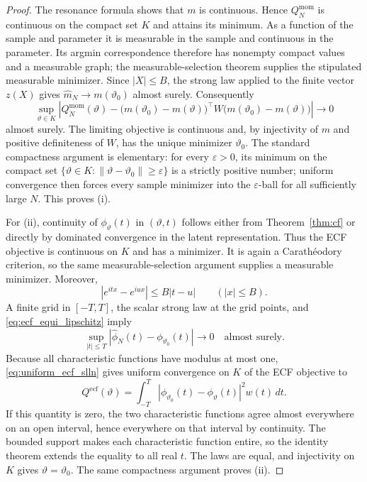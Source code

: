 \documentclass[11pt]{amsart}
\numberwithin{equation}{section}\setcounter{tocdepth}{3}\setcounter{secnumdepth}{3}
\begin{document}
\begin{proof}
The resonance formula shows that $m$ is continuous.  Hence
$Q_N^{\mathrm{mom}}$ is continuous on the compact set $K$ and attains its minimum.
As a function of the sample and parameter it is measurable in the sample and continuous
in the parameter.  Its argmin correspondence therefore has nonempty compact values and
a measurable graph; the measurable-selection theorem supplies the stipulated measurable
minimizer.
Since $|X|\le B$, the strong law applied to the finite vector $z(X)$ gives
$\widehat m_N\to m(\vartheta_0)$ almost surely.  Consequently
\begin{equation}
 \sup_{\vartheta\in K}
 \left|Q_N^{\mathrm{mom}}(\vartheta)
 -\bigl(m(\vartheta_0)-m(\vartheta)\bigr)^\top
 W\bigl(m(\vartheta_0)-m(\vartheta)\bigr)\right|\longrightarrow0
 \label{eq:moment_uniform_objective_convergence}
\end{equation}
almost surely.  The limiting objective is continuous and, by injectivity of $m$ and
positive definiteness of $W$, has the unique minimizer $\vartheta_0$.  The standard
compactness argument is elementary: for every $\varepsilon>0$, its minimum on the
compact set $\{\vartheta\in K:\|\vartheta-\vartheta_0\|\ge\varepsilon\}$ is a strictly
positive number; uniform convergence then forces every sample minimizer into the
$\varepsilon$-ball for all sufficiently large $N$.  This proves (i).

For (ii), continuity of $\phi_\vartheta(t)$ in $(\vartheta,t)$ follows either from
Theorem~\ref{thm:cf} or directly by dominated convergence in the latent representation.
Thus the ECF objective is continuous on $K$ and has a minimizer.  It is again a
Carathéodory criterion, so the same measurable-selection argument supplies a measurable
minimizer.  Moreover,
\begin{equation}
 |e^{itx}-e^{iux}|\le B|t-u| \qquad (|x|\le B).
 \label{eq:ecf_equi_lipschitz}
\end{equation}
A finite grid in $[-T,T]$, the scalar strong law at the grid points, and
\eqref{eq:ecf_equi_lipschitz} imply
\begin{equation}
 \sup_{|t|\le T}|\widehat\phi_N(t)-\phi_{\vartheta_0}(t)|\longrightarrow0
 \quad\text{almost surely}.
 \label{eq:uniform_ecf_slln}
\end{equation}
Because all characteristic functions have modulus at most one,
\eqref{eq:uniform_ecf_slln} gives uniform convergence on $K$ of the ECF objective to
\begin{equation}
 Q^{\mathrm{ecf}}(\vartheta)
 =\int_{-T}^T|\phi_{\vartheta_0}(t)-\phi_\vartheta(t)|^2w(t)\,dt.
 \label{eq:population_ecf_objective}
\end{equation}
If this quantity is zero, the two characteristic functions agree almost everywhere on
an open interval, hence everywhere on that interval by continuity.  The bounded support
makes each characteristic function entire, so the identity theorem extends the equality
to all real $t$.  The laws are equal, and injectivity on $K$ gives
$\vartheta=\vartheta_0$.  The same compactness argument proves (ii).
\end{proof}
\end{document}
